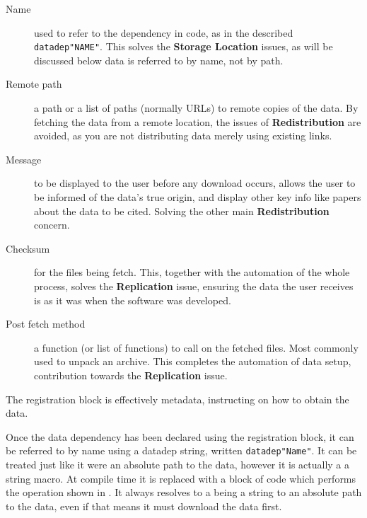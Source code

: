 \documentclass[twoside,11pt]{article}\usepackage{jmlr2e}
\newcommand{\datadep}[1]{\texttt{datadep"{}#1"{}}}
\begin{document}
\begin{description}
	\item[Name] used to refer to the dependency in code, as in the described \datadep{NAME}. 
	This solves the \textbf{Storage Location} issues, as will be discussed below data is referred to by name, not by path.
	\item[Remote path] a path or a list of paths (normally URLs) to remote copies of the data. By fetching the data from a remote location, the issues of \textbf{Redistribution} are avoided, as you are not distributing data merely using existing links.
	\item[Message] to be displayed to the user before any download occurs,  allows the user to be informed of the data's true origin, and display other key info like papers about the data to be cited. Solving the other main \textbf{Redistribution} concern.
	\item[Checksum] for the files being fetch. This, together with the automation of the whole process, solves the \textbf{Replication} issue, 
	ensuring the data the user receives is as it was when the software was developed.
	\item[Post fetch method] a function  (or list of functions) to call on the fetched files. Most commonly used to unpack an archive. This completes the automation of data setup, contribution towards the \textbf{Replication} issue.
\end{description}
\noindent The registration block is effectively metadata, instructing on how to obtain the data.

Once the data dependency has been declared using the registration block, it can be referred to by name using a datadep string, written \datadep{Name}.
It can be treated just like it were an absolute path to the data, however it is actually a a string macro.
At compile time it is replaced with a block of code which performs the operation shown in .
It always resolves to a being a string to an absolute path to the data, even if that means it must download the data first.
\end{document}
